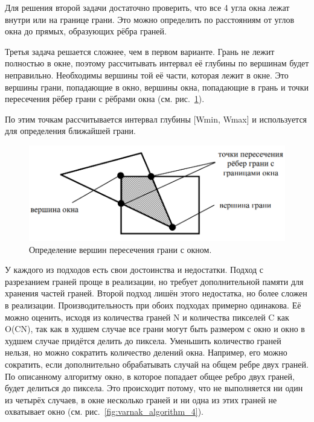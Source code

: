Для решения второй задачи достаточно проверить, что все 4 угла окна лежат внутри или на границе грани. Это можно определить по расстояниям от углов окна до прямых, образующих рёбра граней.

Третья задача решается сложнее, чем в первом варианте. Грань не
лежит полностью в окне, поэтому рассчитывать интервал её глубины по
вершинам будет неправильно. Необходимы вершины той её части, которая
лежит в окне. Это вершины грани, попадающие в окно, вершины окна, попадающие в грань и точки пересечения рёбер грани с рёбрами окна (см.
рис.~\ref{fig:varnak_algorithm_3}).

По этим точкам рассчитывается интервал глубины [Wmin, Wmax] и
используется для определения ближайшей грани.

\begin{figure}[H]
    \centering
    \includegraphics[width=\textwidth]{img/varnak_algorithm_3.png}
    \caption{Определение вершин пересечения грани с окном.}
    \label{fig:varnak_algorithm_3}
\end{figure}

У каждого из подходов есть свои достоинства и недостатки. Подход
с разрезанием граней проще в реализации, но требует дополнительной памяти для хранения частей граней. Второй подход лишён этого недостатка,
но более сложен в реализации. Производительность при обоих подходах
примерно одинакова. Её можно оценить, исходя из количества граней N и
количества пикселей C как O(CN), так как в худшем случае все грани могут быть размером с окно и окно в худшем случае придётся делить до пиксела. Уменьшить количество граней нельзя, но можно сократить количество делений окна. Например, его можно сократить, если дополнительно обрабатывать случай на общем ребре двух граней. По описанному алгоритму окно, в которое попадает общее ребро двух граней, будет делиться до пиксела. Это происходит потому, что не выполняется ни один из четырёх случаев, в окне несколько граней и ни одна из этих граней не охватывает окно (см. рис.~\ref{fig:varnak_algorithm_4}).


